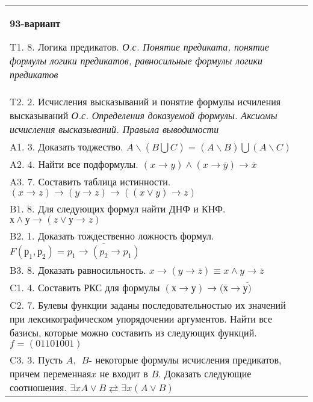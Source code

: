 \documentclass{article}
\begin{document}
\begin{tabular}{m{17cm}}
\textbf{93-вариант}
\newline

T1. 8. Логика предикатов. \emph{О.с. Понятие предиката, понятие формулы логики предикатов, равносильные формулы логики предикатов} \\
T2. 2. Исчисления высказываний и понятие формулы исчиления высказываний \emph{О.с. Определения доказуемой формулы. Аксиомы исчисления высказываний. Правыла выводимости} \\
A1. 3. Доказать тоджество. \(A\backslash(B\bigcup C) = (A\backslash B)\bigcup(A\backslash C)\) \\
A2. 4. Найти все подформулы. \((x \rightarrow y) \land (x \rightarrow \overline{y}) \rightarrow \overline{x}\) \\
A3. 7. Составить таблица истинности. \((x \rightarrow z) \rightarrow (y \rightarrow z) \rightarrow ((x \vee y) \rightarrow z)\) \\
B1. 8. Для следующих формул найти ДНФ и КНФ. \(х \land у \rightarrow (z \vee у \rightarrow z)\) \\
B2. 1. Доказать тождественно ложность формул. \(F\left( р_{1},р_{2} \right) = \overline{p_{1} \rightarrow (p_{2} \rightarrow p_{1})}\) \\
B3. 8. Доказать равносильность. \(x \rightarrow \left( y \rightarrow \overline{z} \right) \equiv x \land y \rightarrow \overline{z}\) \\
C1. 4. Составить РКС для формулы \((х \rightarrow у) \rightarrow (\overline{х} \rightarrow \overline{у)}\) \\
C2. 7. Булевы функции заданы последовательностью их значений при лексикографическом упорядочении аргументов. Найти все базисы, которые можно составить из следующих функций. \(f = (01101001)\) \\
C3. 3. Пусть \(A,\ \ B\)- некоторые формулы исчисления предикатов, причем переменная\(x\) не входит в \(B\). Доказать следующие соотношения. \(\exists xA \vee B \rightleftarrows \exists x(A \vee B)\) \\

\end{tabular}
\vspace{1cm}
\end{document}
